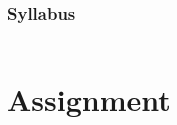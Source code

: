 \documentclass[color=usenames,dvipsnames]{beamer}
\begin{document}
\begin{frame}
  \frametitle{Syllabus}
  \begin{columns}%
    \begin{column}{0.5\textwidth}
%      
    \end{column}
  \end{columns}
\end{frame}








\section{Assignment}
\end{document}
